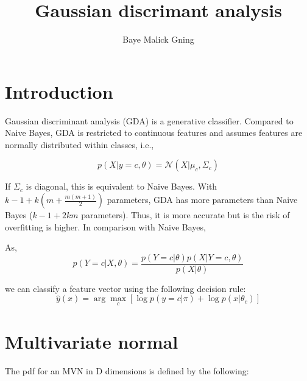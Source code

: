 \documentclass[12pt, a4paper]{article}
\author{Baye Malick Gning}
\date{}
\title{Gaussian discrimant analysis}
\theoremstyle{definition}
\numberwithin{figure}{section}
\numberwithin{equation}{section}
\numberwithin{table}{section}
\begin{document}
\maketitle
\vspace{2cm}


\newpage
\tableofcontents
\newpage


\section{Introduction}
Gaussian discriminant analysis (GDA) is a generative classifier. Compared to Naive Bayes, GDA is restricted to continuous features and assumes features are normally distributed within classes, i.e.,

\begin{equation}
p(X|y=c,\theta)=\mathcal{N}(X|\mu_c, \Sigma_c)
\label{eq:qda-features}
\end{equation}

If $\Sigma_c$ is diagonal, this is equivalent to Naive Bayes. With $k-1+k\left(m+\frac{m(m+1)}{2}\right)$ parameters, GDA has more parameters than Naive Bayes ($k-1+2km$ parameters). Thus, it is more accurate but is the risk of overfitting is higher. In comparison with Naive Bayes, 


As,
\begin{equation}
p(Y = c | X, \theta) = \frac{p(Y = c | \theta) p(X | Y = c, \theta)}{p(X |\theta)}
\label{eq:qda-bayes-formula}
\end{equation}

we can classify a feature vector using the following decision rule:
\begin{equation}
\hat{y}(x) = \arg\max_c \left[ \log p(y = c | \pi) + \log p(x | \theta_c) \right]
\end{equation}

\section{Multivariate normal}
The pdf for an MVN in D dimensions is deﬁned by the following:
\end{document}
